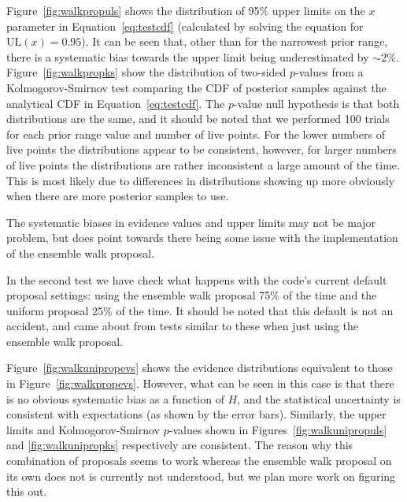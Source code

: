 Figure~\ref{fig:walkpropuls} shows the distribution of 95\% upper limits on the $x$ parameter in Equation~\ref{eq:testcdf} (calculated by solving
the equation for $\text{UL}(x) = 0.95$). It can be seen that, other than for the narrowest prior range, there is a systematic bias towards the
upper limit being underestimated by $\sim 2\%$. Figure~\ref{fig:walkpropks} show the distribution of two-sided $p$-values from a Kolmogorov-Smirnov
test comparing the CDF of posterior samples against the analytical CDF in Equation~\ref{eq:testcdf}. The $p$-value null hypothesis is that both
distributions are the same, and it should be noted that we performed 100 trials for each prior range value and number of live points. For the
lower numbers of live points the distributions appear to be consistent, however, for larger numbers of live points the distributions are rather
inconsistent a large amount of the time. This is most likely due to differences in distributions showing up more obviously when there are more
posterior samples to use.

The systematic biases in evidence values and upper limits may not be major problem, but does point towards there being some issue with the
implementation of the ensemble walk proposal.

In the second test we have check what happens with the code's current default proposal settings: using the ensemble walk proposal 75\%
of the time and the uniform proposal 25\% of the time. It should be noted that this default is not an accident, and came about from tests
similar to these when just using the ensemble walk proposal.

Figure~\ref{fig:walkunipropevs} shows the evidence distributions equivalent to those in Figure~\ref{fig:walkpropevs}. However, what can
be seen in this case is that there is no obvious systematic bias as a function of $H$, and the statistical uncertainty is
consistent with expectations (as shown by the error bars). Similarly, the upper limits and Kolmogorov-Smirnov $p$-values shown in
Figures~\ref{fig:walkunipropuls} and \ref{fig:walkunipropks} respectively are consistent. The reason why this combination of proposals
seems to work whereas the ensemble walk proposal on its own does not is currently not understood, but we plan more work on figuring this
out.

